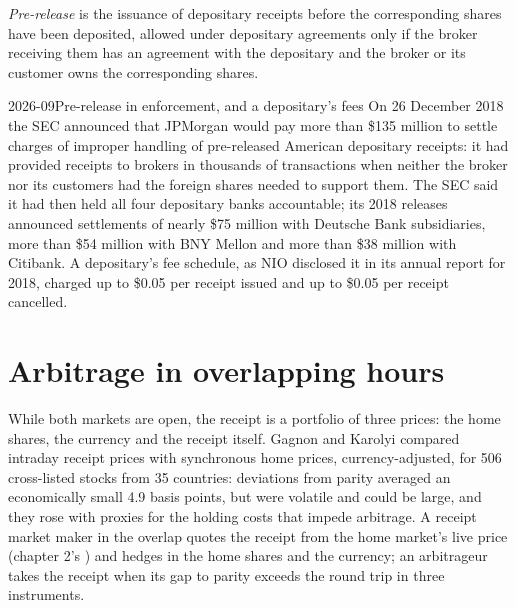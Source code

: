 \begin{definition}\label{def:hf:depositary-receipts-and-dual-listings:prerelease}
\emph{Pre-release} is the issuance of depositary receipts before the corresponding shares have been deposited, allowed under
depositary agreements only if the broker receiving them has an agreement with the depositary and the broker or its customer owns the
corresponding shares.
\end{definition}

\begin{dated}{2026-09}{Pre-release in enforcement, and a depositary's fees}\label{dat:hf:depositary-receipts-and-dual-listings:prerelease}
On 26 December 2018 the SEC announced that JPMorgan would pay more than \$135 million to settle charges of improper handling of pre-released
American depositary receipts: it had provided receipts to brokers in thousands of  transactions when neither the broker nor its customers
had the foreign shares needed to support them. The SEC said it had then held all four depositary banks accountable; its 2018 releases announced
settlements of nearly \$75 million with Deutsche Bank subsidiaries, more than \$54 million with BNY Mellon and more than \$38 million with Citibank. A
depositary's fee schedule, as NIO disclosed it in its annual report for 2018, charged up to \$0.05 per receipt issued and up to \$0.05 per receipt
cancelled.
\end{dated}

\section{Arbitrage in overlapping hours}

While both markets are open, the receipt is a portfolio of three prices: the home shares, the currency and the receipt itself. Gagnon and Karolyi
compared intraday receipt prices with synchronous home prices, currency-adjusted, for 506 cross-listed stocks from 35 countries: deviations from
parity averaged an economically small 4.9 basis points, but were volatile and could be large, and they rose with proxies for the holding costs that
impede arbitrage. A receipt market maker in the overlap quotes the receipt from the home market's live price (chapter 2's )
and hedges in the home shares and the currency; an arbitrageur takes the receipt when its gap to parity exceeds the round trip in three instruments.

